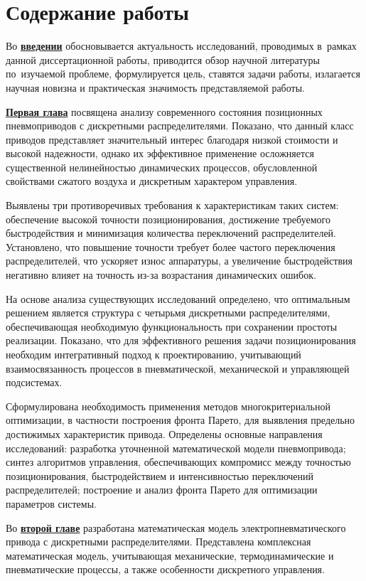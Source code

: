 \section*{Содержание работы}
Во \underline{\textbf{введении}} обосновывается актуальность
исследований, проводимых в~рамках данной диссертационной работы,
приводится обзор научной литературы по~изучаемой проблеме,
формулируется цель, ставятся задачи работы, излагается научная новизна
и практическая значимость представляемой работы.


\underline{\textbf{Первая глава}}
посвящена анализу современного
состояния позиционных пневмоприводов с дискретными распределителями.
Показано, что данный класс приводов представляет значительный интерес
благодаря низкой стоимости и высокой надежности, однако их эффективное
применение осложняется существенной нелинейностью динамических процессов,
обусловленной свойствами сжатого воздуха и дискретным характером управления.

Выявлены три противоречивых требования к характеристикам таких систем: обеспечение
высокой точности позиционирования, достижение требуемого быстродействия и минимизация
количества переключений распределителей. Установлено, что повышение точности
требует более частого переключения распределителей, что ускоряет износ аппаратуры,
а увеличение быстродействия негативно влияет на точность из-за возрастания динамических ошибок.

На основе анализа существующих исследований определено, что оптимальным
решением является структура с четырьмя дискретными распределителями, обеспечивающая
необходимую функциональность при сохранении простоты реализации. Показано,
что для эффективного решения задачи позиционирования необходим
интегративный подход к проектированию, учитывающий взаимосвязанность
процессов в пневматической, механической и управляющей подсистемах.

Сформулирована необходимость применения методов многокритериальной оптимизации,
в частности построения фронта Парето, для выявления предельно достижимых
характеристик привода. Определены основные направления исследований:
разработка уточненной математической модели пневмопривода;
синтез алгоритмов управления, обеспечивающих компромисс между
точностью позиционирования, быстродействием и интенсивностью
переключений распределителей; построение и анализ фронта
Парето для оптимизации параметров системы.

Во \underline{\textbf{второй главе}} разработана математическая модель
электропневматического привода с дискретными
распределителями. Представлена комплексная математическая модель, учитывающая механические,
термодинамические и пневматические процессы, а также особенности дискретного управления.

